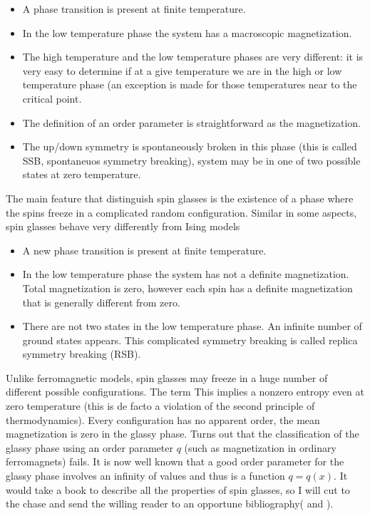 \begin{itemize}
\item{A phase transition is present at finite temperature.}
\item{In the low temperature phase the system has a macroscopic magnetization.}
\item{The high temperature and the low temperature phases are very different: it is very easy to determine if at a give temperature we are in the high or low temperature phase (an exception is made for those temperatures near to the critical point.}
\item{The definition of an order parameter is straightforward as the magnetization.}
\item{The up/down symmetry is spontaneously broken in this phase (this is called SSB, spontaneuos symmetry breaking), system may be in one of two possible states at zero temperature.}

\end{itemize}

The main feature that distinguish spin glasses is the existence of a phase where the spins freeze in a complicated random configuration. Similar in some aspects, spin glasses behave very differently from Ising models

\begin{itemize}
\item{A new phase transition is present at finite temperature.}
\item{In the low temperature phase the system has not a definite magnetization. Total magnetization is zero, however each spin has a definite magnetization that is generally different from zero.}
\item{There are not two states in the low temperature phase. An infinite number of ground states appears. This complicated symmetry breaking is called replica symmetry breaking (RSB).}

\end{itemize}


Unlike ferromagnetic models, spin glasses may freeze in a huge number of different possible configurations. The term
This implies a nonzero entropy even at zero temperature (this is de facto a violation of the second principle of thermodynamics). Every configuration has no apparent order, the mean magnetization is zero in the glassy phase. Turns out that the classification of the glassy phase using an order parameter $q$ (such as magnetization in ordinary ferromagnets) fails. It is now well known that a good order parameter for the glassy phase involves an infinity of values and thus is a function $q = q(x)$. It would take a book to describe all the properties of spin glasses, so I will cut to the chase and send the willing reader to an opportune bibliography( \cite{beyond} and \cite{glass}).

